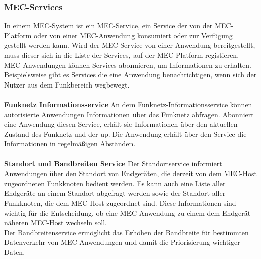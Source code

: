 \documentclass[runningheads]{llncs}
\numberwithin{figure}{section}
\begin{document}
\subsubsection{MEC-Services}
In einem MEC-System ist ein MEC-Service, 
ein Service der von der MEC-Platform oder von einer MEC-Anwendung konsumiert oder zur Verfügung gestellt werden kann. 
Wird der MEC-Service von einer Anwendung bereitgestellt, 
muss dieser sich in die Liste der Services, auf der MEC-Platform registieren. MEC-Anwendungen können 
Services abonnieren, um Informationen zu erhalten. Beispielsweise gibt es Services die eine Anwendung benachrichtigen, wenn sich der Nutzer aus dem Funkbereich wegbewegt.
\\
\\
\textbf{Funknetz Informationsservice}
An dem Funknetz-Informationsservice können autorisierte Anwendungen Informationen über das Funknetz abfragen.
Abonniert eine Anwendung diesen Service, erhält sie Informationen über den aktuellen Zustand des Funknetz und der \acrshort{up}. 
Die Anwendung erhält über den Service
die Informationen in regelmäßigen Abständen.
\\
\\
\textbf{Standort und Bandbreiten Service}
Der Standortservice informiert Anwendungen über den Standort von Endgeräten, 
die derzeit von dem MEC-Host zugeordneten Funkknoten bedient werden. 
Es kann auch eine Liste aller Endgeräte an einem Standort abgefragt werden sowie der Standort aller
Funkknoten, die dem MEC-Host zugeordnet sind. 
Diese Informationen sind wichtig für die Entscheidung, ob eine MEC-Anwendung zu einem dem Endgerät näheren MEC-Host wechseln soll.
\\
Der Bandbreitenservice ermöglicht das Erhöhen der Bandbreite für bestimmten Datenverkehr von MEC-Anwendungen und damit die Priorisierung wichtiger Daten.
\newpage
\end{document}
